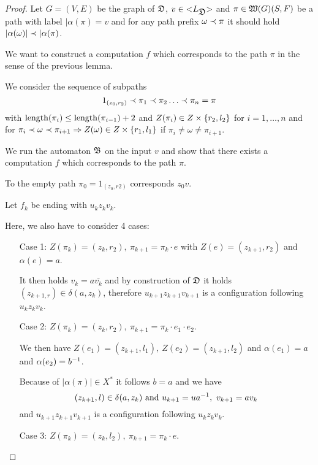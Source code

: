 \begin{proof}
Let $G = (V, E)$ be the graph of $\mbox{$\mathfrak{D}$}$, $v \in \mbox{${<}{L_{\mbox{$\mathfrak{D}$}}}{>}$}$ and
$\pi \in \mbox{$\mathfrak{W}({G})$}(S, F)$ be a path with label $|\alpha(\pi) = v$ and for any
path prefix $\omega \prec \pi$ it should hold $|\alpha(\omega)| \prec
|\alpha(\pi)$.

We want to construct a computation $f$ which corresponds to the path $\pi$ in
the sense of the previous lemma.

We consider the sequence of subpaths
\[ 1_{(z_0, r_2)} \prec \pi_1 \prec \pi_2 \ldots \prec \pi_n = \pi \]
with $\mathrm{length}({\pi_i}) \leq \mathrm{length}({\pi_{i-1}}) + 2$ and $Z(\pi_i) \in Z \times
\mbox{$\{r_2, l_2\}$}$ for $i = 1, \ldots, n$ and for $\pi_i \prec \omega \prec
\pi_{i+1} \Rightarrow Z(\omega) \in Z \times \mbox{$\{r_1, l_1\}$}$ if $\pi_i
\neq \omega \neq \pi_{i+1}$.

We run the automaton $\mbox{$\mathfrak{B}$}$ on the input $v$ and show that there exists a
computation $f$ which corresponds to the path $\pi$.

\medskip
To the empty path $\pi_0 = 1_{(z_0, r2)}$ corresponds $z_0 v$.

Let $f_k$ be ending with $u_k z_k v_k$.

Here, we also have to consider 4 cases:

\begin{itemize}
  \item[Case 1:] $Z(\pi_k) = (z_k, r_2),\ \pi_{k+1} = \pi_k \cdot e$ with $Z(e)
  = (z_{k+1}, r_2)$ and $\alpha(e) = a$.
  
  It then holds $v_k = a \bar{v_k}$ and by construction of $\mbox{$\mathfrak{D}$}$ it holds
  $(z_{k+1, r}) \in \delta(a, z_k)$, therefore $u_{k+1} z_{k+1} v_{k+1}$ is a
  configuration following $u_{k} z_{k} v_{k}$.
   
  \item[Case 2:] $Z(\pi_k) = (z_k, r_2),\ \pi_{k+1} = \pi_k \cdot e_1 \cdot
  e_2$.
  
  We then have $Z(e_1) = (z_{k+1}, l_1),\ Z(e_2) = (z_{k+1}, l_2)$ and
  $\alpha(e_1) = a$ and $\alpha(e_2) = {{b}^{-1}}$.
  
  Because of $|\alpha(\pi)| \in X^*$ it follows $b = a$ and we have
  \[ (z_{k+1}, l) \in \delta(a, z_k)\text{ and }u_{k+1} = u {{a}^{-1}},\ v_{k+1} =
  a v_k \]
  and $u_{k+1} z_{k+1} v_{k+1}$ is a configuration following $u_{k} z_{k} v_{k}$.
  
  \item[Case 3:] $Z(\pi_k) = (z_k, l_2),\ \pi_{k+1} = \pi_k \cdot e$.
  

\end{itemize}
\end{proof}

